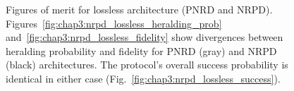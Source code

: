 \documentclass[aps,twocolumn,secnumarabic,amsmath,amssymb,pra,groupedaddress,
showpacs, showkeys]{revtex4-1}
\begin{document}
\begin{figure}[t]
\centering
{}

\caption{\label{fig:chap3:nrpd_lossless}Figures of merit for lossless architecture (PNRD and NRPD). Figures~\ref{fig:chap3:nrpd_lossless_heralding_prob} and~\ref{fig:chap3:nrpd_lossless_fidelity} show divergences between heralding probability and fidelity for PNRD (gray) and NRPD (black) architectures. The protocol's overall success probability is identical in either case (Fig.~\ref{fig:chap3:nrpd_lossless_success}).}
\end{figure}
\end{document}
